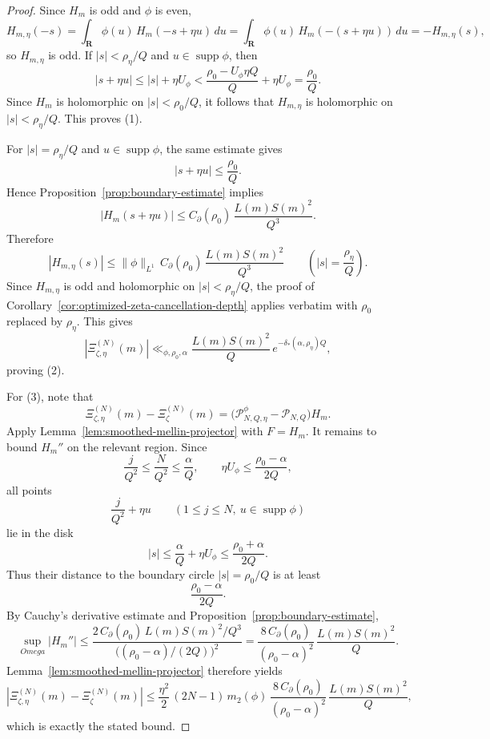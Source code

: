 \documentclass[11pt,a4paper]{amsart}
\def\Omega{Omega}%
\theoremstyle{plain}
\theoremstyle{definition}
\begin{document}
\begin{proof}
Since $H_m$ is odd and $\phi$ is even,
\[
H_{m,\eta}(-s)
=
\int_{\mathbf R}\phi(u)\,H_m(-s+\eta u)\,du
=
\int_{\mathbf R}\phi(u)\,H_m(-(s+\eta u))\,du
=
-H_{m,\eta}(s),
\]
so $H_{m,\eta}$ is odd. If $|s|<\rho_\eta/Q$ and $u\in \operatorname{supp}\phi$,
then
\[
|s+\eta u|
\le
|s|+\eta U_\phi
<
\frac{\rho_0-U_\phi\eta Q}{Q}+\eta U_\phi
=
\frac{\rho_0}{Q}.
\]
Since $H_m$ is holomorphic on $|s|<\rho_0/Q$, it follows that
$H_{m,\eta}$ is holomorphic on $|s|<\rho_\eta/Q$. This proves (1).

For $|s|=\rho_\eta/Q$ and $u\in \operatorname{supp}\phi$, the same estimate gives
\[
|s+\eta u|\le \frac{\rho_0}{Q}.
\]
Hence Proposition~\ref{prop:boundary-estimate} implies
\[
|H_m(s+\eta u)|
\le
C_{\partial}(\rho_0)\,\frac{L(m)S(m)^2}{Q^3}.
\]
Therefore
\[
|H_{m,\eta}(s)|
\le
\|\phi\|_{L^1}\,C_{\partial}(\rho_0)\,\frac{L(m)S(m)^2}{Q^3}
\qquad
\left(|s|=\frac{\rho_\eta}{Q}\right).
\]
Since $H_{m,\eta}$ is odd and holomorphic on $|s|<\rho_\eta/Q$, the proof of
Corollary~\ref{cor:optimized-zeta-cancellation-depth} applies verbatim with
$\rho_0$ replaced by $\rho_\eta$. This gives
\[
|\Xi_{\zeta,\eta}^{(N)}(m)|
\ll_{\phi,\rho_0,\alpha}
\frac{L(m)S(m)^2}{Q}\,
e^{-\delta_*(\alpha,\rho_\eta)Q},
\]
proving (2).

For (3), note that
\[
\Xi_{\zeta,\eta}^{(N)}(m)-\Xi_{\zeta}^{(N)}(m)
=
\bigl(\mathcal P_{N,Q,\eta}^{\phi}-\mathcal P_{N,Q}\bigr)H_m.
\]
Apply Lemma~\ref{lem:smoothed-mellin-projector} with $F=H_m$. It remains to
bound $H_m''$ on the relevant region. Since
\[
\frac{j}{Q^2}\le \frac{N}{Q^2}\le \frac{\alpha}{Q},
\qquad
\eta U_\phi\le \frac{\rho_0-\alpha}{2Q},
\]
all points
\[
\frac{j}{Q^2}+\eta u
\qquad
(1\le j\le N,\ u\in\operatorname{supp}\phi)
\]
lie in the disk
\[
|s|\le \frac{\alpha}{Q}+\eta U_\phi
\le
\frac{\rho_0+\alpha}{2Q}.
\]
Thus their distance to the boundary circle $|s|=\rho_0/Q$ is at least
\[
\frac{\rho_0-\alpha}{2Q}.
\]
By Cauchy's derivative estimate and Proposition~\ref{prop:boundary-estimate},
\[
\sup_{\Omega}|H_m''|
\le
\frac{2\,C_{\partial}(\rho_0)\,L(m)S(m)^2/Q^3}
{\bigl((\rho_0-\alpha)/(2Q)\bigr)^2}
=
\frac{8\,C_{\partial}(\rho_0)}{(\rho_0-\alpha)^2}\,
\frac{L(m)S(m)^2}{Q}.
\]
Lemma~\ref{lem:smoothed-mellin-projector} therefore yields
\[
|\Xi_{\zeta,\eta}^{(N)}(m)-\Xi_{\zeta}^{(N)}(m)|
\le
\frac{\eta^2}{2}\,(2N-1)\,m_2(\phi)\,
\frac{8\,C_{\partial}(\rho_0)}{(\rho_0-\alpha)^2}\,
\frac{L(m)S(m)^2}{Q},
\]
which is exactly the stated bound.
\end{proof}
\end{document}
